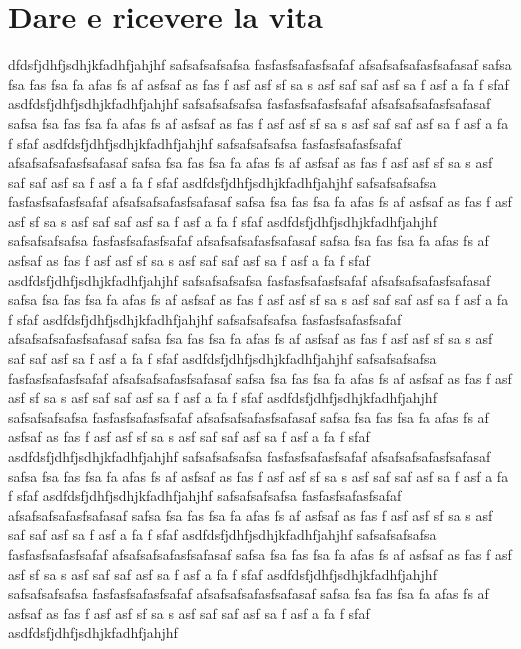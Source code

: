 \section{Dare e ricevere la vita}

dfdsfjdhfjsdhjkfadhfjahjhf
safsafsafsafsa
fasfasfsafasfsafaf
afsafsafsafasfsafasaf safsa fsa fas fsa fa afas fs af asfsaf as fas f asf asf sf sa s asf saf saf asf sa f asf a fa f sfaf asdfdsfjdhfjsdhjkfadhfjahjhf
safsafsafsafsa
fasfasfsafasfsafaf
afsafsafsafasfsafasaf safsa fsa fas fsa fa afas fs af asfsaf as fas f asf asf sf sa s asf saf saf asf sa f asf a fa f sfaf asdfdsfjdhfjsdhjkfadhfjahjhf
safsafsafsafsa
fasfasfsafasfsafaf
afsafsafsafasfsafasaf safsa fsa fas fsa fa afas fs af asfsaf as fas f asf asf sf sa s asf saf saf asf sa f asf a fa f sfaf asdfdsfjdhfjsdhjkfadhfjahjhf
safsafsafsafsa
fasfasfsafasfsafaf
afsafsafsafasfsafasaf safsa fsa fas fsa fa afas fs af asfsaf as fas f asf asf sf sa s asf saf saf asf sa f asf a fa f sfaf asdfdsfjdhfjsdhjkfadhfjahjhf
safsafsafsafsa
fasfasfsafasfsafaf
afsafsafsafasfsafasaf safsa fsa fas fsa fa afas fs af asfsaf as fas f asf asf sf sa s asf saf saf asf sa f asf a fa f sfaf asdfdsfjdhfjsdhjkfadhfjahjhf
safsafsafsafsa
fasfasfsafasfsafaf
afsafsafsafasfsafasaf safsa fsa fas fsa fa afas fs af asfsaf as fas f asf asf sf sa s asf saf saf asf sa f asf a fa f sfaf asdfdsfjdhfjsdhjkfadhfjahjhf
safsafsafsafsa
fasfasfsafasfsafaf
afsafsafsafasfsafasaf safsa fsa fas fsa fa afas fs af asfsaf as fas f asf asf sf sa s asf saf saf asf sa f asf a fa f sfaf asdfdsfjdhfjsdhjkfadhfjahjhf
safsafsafsafsa
fasfasfsafasfsafaf
afsafsafsafasfsafasaf safsa fsa fas fsa fa afas fs af asfsaf as fas f asf asf sf sa s asf saf saf asf sa f asf a fa f sfaf asdfdsfjdhfjsdhjkfadhfjahjhf
safsafsafsafsa
fasfasfsafasfsafaf
afsafsafsafasfsafasaf safsa fsa fas fsa fa afas fs af asfsaf as fas f asf asf sf sa s asf saf saf asf sa f asf a fa f sfaf asdfdsfjdhfjsdhjkfadhfjahjhf
safsafsafsafsa
fasfasfsafasfsafaf
afsafsafsafasfsafasaf safsa fsa fas fsa fa afas fs af asfsaf as fas f asf asf sf sa s asf saf saf asf sa f asf a fa f sfaf asdfdsfjdhfjsdhjkfadhfjahjhf
safsafsafsafsa
fasfasfsafasfsafaf
afsafsafsafasfsafasaf safsa fsa fas fsa fa afas fs af asfsaf as fas f asf asf sf sa s asf saf saf asf sa f asf a fa f sfaf asdfdsfjdhfjsdhjkfadhfjahjhf
safsafsafsafsa
fasfasfsafasfsafaf
afsafsafsafasfsafasaf safsa fsa fas fsa fa afas fs af asfsaf as fas f asf asf sf sa s asf saf saf asf sa f asf a fa f sfaf asdfdsfjdhfjsdhjkfadhfjahjhf
safsafsafsafsa
fasfasfsafasfsafaf
afsafsafsafasfsafasaf safsa fsa fas fsa fa afas fs af asfsaf as fas f asf asf sf sa s asf saf saf asf sa f asf a fa f sfaf asdfdsfjdhfjsdhjkfadhfjahjhf
